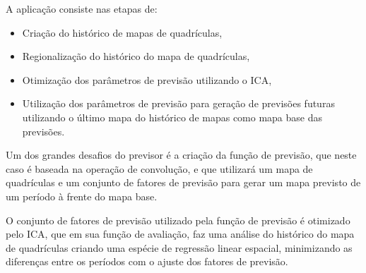 A aplicação consiste nas etapas de:
\begin{itemize}
	\item Criação do histórico de mapas de quadrículas,
	\item Regionalização do histórico do mapa de quadrículas,
	\item Otimização dos parâmetros de previsão utilizando o ICA,
	\item Utilização dos parâmetros de previsão para geração de previsões futuras utilizando o último mapa do histórico de mapas como mapa base das previsões.
\end{itemize}    

Um dos grandes desafios do previsor é a criação da função de previsão, que neste caso é baseada na operação de convolução, e que utilizará um mapa de quadrículas e um conjunto de fatores de previsão para gerar um mapa previsto de um período à frente do mapa base.

O conjunto de fatores de previsão utilizado pela função de previsão é otimizado pelo ICA, que em sua função de avaliação, faz uma análise do histórico do mapa de quadrículas criando uma espécie de regressão linear espacial, minimizando as diferenças entre os períodos com o ajuste dos fatores de previsão.
